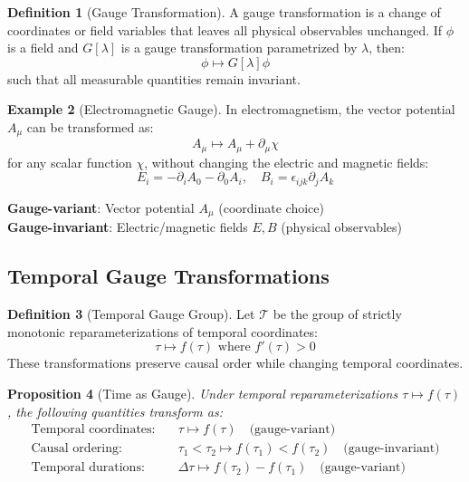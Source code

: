 \documentclass[11pt]{article}
\theoremstyle{definition}
\newtheorem{definition}{Definition}[section]
\newtheorem{example}[definition]{Example}
\theoremstyle{plain}
\newtheorem{proposition}[definition]{Proposition}
\theoremstyle{remark}
\newcommand{\T}{\mathcal{T}}
\begin{document}
\begin{definition}[Gauge Transformation]
A gauge transformation is a change of coordinates or field variables that leaves all physical observables unchanged. If $\phi$ is a field and $G[\lambda]$ is a gauge transformation parametrized by $\lambda$, then:
$$\phi \mapsto G[\lambda] \phi$$
such that all measurable quantities remain invariant.
\end{definition}

\begin{example}[Electromagnetic Gauge]
In electromagnetism, the vector potential $A_\mu$ can be transformed as:
$$A_\mu \mapsto A_\mu + \partial_\mu \chi$$
for any scalar function $\chi$, without changing the electric and magnetic fields:
$$E_i = -\partial_i A_0 - \partial_0 A_i, \quad B_i = \epsilon_{ijk}\partial_j A_k$$
\end{example}

\begin{keypoint}
\textbf{Gauge-variant}: Vector potential $A_\mu$ (coordinate choice)\\
\textbf{Gauge-invariant}: Electric/magnetic fields $E, B$ (physical observables)
\end{keypoint}

\subsection{Temporal Gauge Transformations}

\begin{definition}[Temporal Gauge Group]
Let $\T$ be the group of strictly monotonic reparameterizations of temporal coordinates:
$$\tau \mapsto f(\tau) \text{ where } f'(\tau) > 0$$
These transformations preserve causal order while changing temporal coordinates.
\end{definition}

\begin{proposition}[Time as Gauge]
Under temporal reparameterizations $\tau \mapsto f(\tau)$, the following quantities transform as:
\begin{align}
\text{Temporal coordinates:} \quad &\tau \mapsto f(\tau) \quad \text{(gauge-variant)}\\
\text{Causal ordering:} \quad &\tau_1 < \tau_2 \mapsto f(\tau_1) < f(\tau_2) \quad \text{(gauge-invariant)}\\
\text{Temporal durations:} \quad &\Delta\tau \mapsto f(\tau_2) - f(\tau_1) \quad \text{(gauge-variant)}
\end{align}
\end{proposition}
\end{document}
